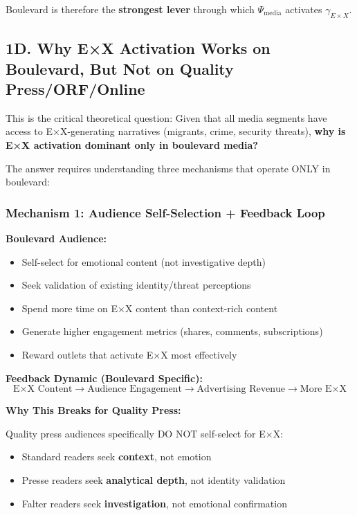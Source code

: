Boulevard is therefore the \textbf{strongest lever} through which $\Psi_{\text{media}}$ activates $\gamma_{E \times X}$.

\label{sec:dx-why-asymmetric}

\subsection*{1D. Why E×X Activation Works on Boulevard, But Not on Quality Press/ORF/Online}

This is the critical theoretical question: Given that all media segments have access to E×X-generating
narratives (migrants, crime, security threats), \textbf{why is E×X activation dominant only in boulevard media?}

The answer requires understanding three mechanisms that operate ONLY in boulevard:

\subsubsection*{Mechanism 1: Audience Self-Selection + Feedback Loop}

\textbf{Boulevard Audience:}
\begin{itemize}
\item Self-select for emotional content (not investigative depth)
\item Seek validation of existing identity/threat perceptions
\item Spend more time on E×X content than context-rich content
\item Generate higher engagement metrics (shares, comments, subscriptions)
\item Reward outlets that activate E×X most effectively
\end{itemize}

\textbf{Feedback Dynamic (Boulevard Specific):}
\[
\text{E×X Content} \rightarrow \text{Audience Engagement} \rightarrow \text{Advertising Revenue} \rightarrow \text{More E×X}
\]

\textbf{Why This Breaks for Quality Press:}

Quality press audiences specifically DO NOT self-select for E×X:
\begin{itemize}
\item Standard readers seek \textbf{context}, not emotion
\item Presse readers seek \textbf{analytical depth}, not identity validation
\item Falter readers seek \textbf{investigation}, not emotional confirmation
\end{itemize}

